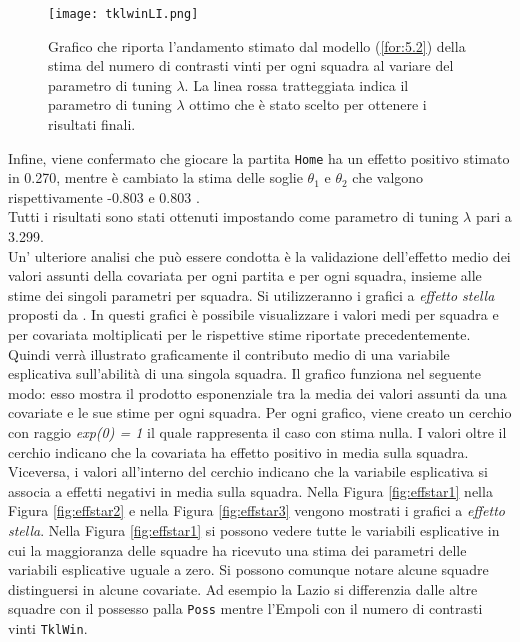 \begin{figure}[htbp]
	\begin{center}
		\texttt{[image: tklwinLI.png]}
		\caption{Grafico che riporta l'andamento stimato dal modello (\ref{for:5.2}) della stima del numero di contrasti vinti per ogni squadra al variare del parametro di tuning $\lambda$. La linea rossa tratteggiata indica il parametro di tuning $\lambda$ ottimo che è stato scelto per ottenere i risultati finali.} \label{fig:tklwinLI}
	\end{center}
\end{figure}
Infine, viene confermato che giocare la partita \texttt{Home} ha un effetto positivo stimato in 0.270, mentre è cambiato la stima delle soglie $\theta_1$ e $\theta_2$ che valgono rispettivamente -0.803  e 0.803 .\\
Tutti i risultati sono stati ottenuti impostando come parametro di tuning $\lambda$ pari a 3.299.\\

Un' ulteriore analisi che può essere condotta è la validazione dell'effetto medio dei valori assunti della covariata per ogni partita e per ogni squadra, insieme alle stime dei singoli parametri per squadra. Si utilizzeranno i grafici a \emph{effetto stella} proposti da \textcite{tutz2013visualization}. In questi grafici è possibile visualizzare i valori medi per squadra e per covariata moltiplicati per le rispettive stime riportate precedentemente. Quindi verrà illustrato graficamente il contributo medio di una variabile esplicativa sull'abilità di una singola squadra. Il grafico funziona nel seguente modo: esso mostra il prodotto esponenziale tra la media dei valori assunti da una covariate e le sue stime per ogni squadra. Per ogni grafico, viene creato un cerchio con raggio \emph{exp(0) = 1} il quale rappresenta il caso con stima nulla. I valori oltre il cerchio indicano che la covariata ha effetto positivo in media sulla squadra. Viceversa, i valori all'interno del cerchio indicano che la variabile esplicativa si associa a effetti negativi in media sulla squadra. Nella Figura \ref{fig:effstar1} nella Figura \ref{fig:effstar2} e nella Figura \ref{fig:effstar3} vengono mostrati i grafici a \emph{effetto stella}.
Nella Figura \ref{fig:effstar1} si possono vedere tutte le variabili esplicative in cui la maggioranza delle squadre ha ricevuto una stima dei parametri delle variabili esplicative   uguale a zero. Si possono comunque notare alcune squadre distinguersi in alcune covariate.
Ad esempio la Lazio si differenzia dalle altre squadre con il possesso palla \texttt{Poss} mentre l'Empoli con il numero di contrasti vinti \texttt{TklWin}.\\

